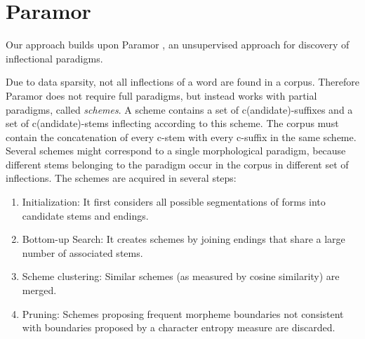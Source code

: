 \documentclass[11pt]{article}
\begin{document}
%


\section{Paramor}
\label{sec:paramor}

Our approach builds upon Paramor \cite{monson09}, an unsupervised approach for discovery of inflectional paradigms.

Due to data sparsity, not all inflections of a word are found in a corpus. Therefore Paramor does not require
full paradigms, but instead works with partial paradigms, called \emph{schemes}. A scheme contains a set of c(andidate)-suffixes and a set of c(andidate)-stems inflecting according to this scheme. The corpus must contain the concatenation of every c-stem with every c-suffix in the same scheme.
Several schemes might correspond to a single morphological paradigm, because different stems belonging to the paradigm occur in the corpus in different set of inflections.
%
The schemes are acquired in several steps:
\begin{enumerate}
\item Initialization: It first considers all possible segmentations of forms into candidate stems and endings.
\item Bottom-up Search: It creates schemes by joining endings that share a large number of associated stems.
\item Scheme clustering: Similar schemes (as measured by cosine similarity) are merged.
\item Pruning: Schemes proposing frequent morpheme boundaries not consistent with boundaries proposed by a character entropy measure are discarded.
\end{enumerate}
\end{document}
